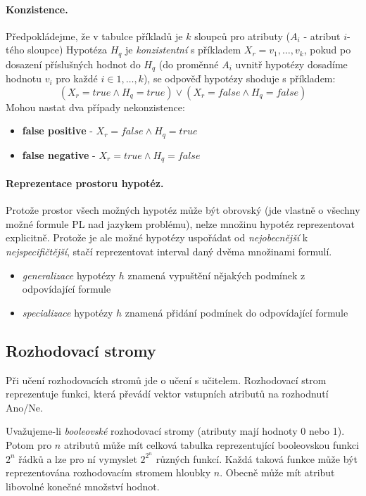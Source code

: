 \documentclass[a4paper]{article}      %
\begin{document}
\paragraph{Konzistence.} Předpokládejme, že v tabulce příkladů je $k$ sloupců pro atributy ($A_i$ - atribut $i$-tého sloupce)
Hypotéza $H_q$ je \emph{konzistentní} s příkladem $X_r = v_1,\ldots,v_k$, pokud po dosazení příslušných hodnot do $H_q$ (do proměnné $A_i$ uvnitř hypotézy dosadíme hodnotu $v_i$ pro každé $i \in 1,\ldots,k$), se odpověď hypotézy shoduje s příkladem:
\[
(X_r = true \wedge H_q = true) \vee (X_r = false \wedge H_q = false)
\]
Mohou nastat dva případy nekonzistence:
\begin{itemize}
\item \textbf{false positive} - $X_r = false \wedge H_q = true$ 
\item \textbf{false negative} - $X_r = true \wedge H_q = false$
\end{itemize}

\paragraph{Reprezentace prostoru hypotéz.} Protože prostor všech možných hypotéz může být obrovský (jde vlastně o všechny možné formule PL nad jazykem problému), nelze množinu hypotéz reprezentovat explicitně. Protože je ale možné hypotézy uspořádat od \emph{nejobecnější} k \emph{nejspecifičtější}, stačí reprezentovat interval daný dvěma množinami formulí.
\begin{itemize}
\item \emph{generalizace} hypotézy $h$ znamená vypuštění nějakých podmínek z odpovídající formule
\item \emph{specializace} hypotézy $h$ znamená přidání podmínek do odpovídající formule
\end{itemize}

\subsection{Rozhodovací stromy}
Při učení rozhodovacích stromů jde o učení s učitelem. Rozhodovací strom reprezentuje funkci, která převádí vektor vstupních atributů na rozhodnutí Ano/Ne.

Uvažujeme-li \emph{booleovské} rozhodovací stromy (atributy mají hodnoty 0 nebo 1). Potom pro $n$ atributů může mít celková tabulka reprezentující booleovskou funkci $2^{n}$ řádků a lze pro ní vymyslet $2^{2^{n}}$ různých funkcí. Každá taková funkce může být reprezentována rozhodovacím stromem hloubky $n$. Obecně může mít atribut libovolné konečné množství hodnot.
\end{document}
